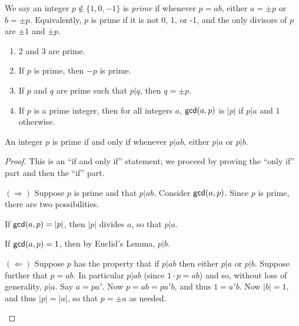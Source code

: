\begin{dfn}[Prime] \label{dfn:zz-prime}
We say an integer \(p \notin \{1,0,-1\}\) is \emph{prime} if whenever \(p = ab\), either \(a = \pm p\) or \(b = \pm p\).
Equivalently, \(p\) is prime if it is not 0, 1, or -1, and the only divisors of \(p\) are \(\pm 1\) and \(\pm p\).
\end{dfn}

\begin{prop} \mbox{}
\begin{enumerate}
\item 2 and 3 are prime.
\item If \(p\) is prime, then \(-p\) is prime.
\item If \(p\) and \(q\) are prime such that \(p|q\), then \(q = \pm p\).
\item If \(p\) is a prime integer, then for all integers \(a\), \(\mathsf{gcd}(a, p)\) is \(|p|\) if \(p|a\) and \(1\) otherwise.
\end{enumerate}
\end{prop}

\begin{prop} \label{prop:zz-prime-2}
An integer \(p\) is prime if and only if whenever \(p|ab\), either \(p|a\) or \(p|b\).
\end{prop}

\begin{proof}
This is an ``if and only if'' statement; we proceed by proving the ``only if'' part and then the ``if'' part.
\begin{inlineproplist}
\item[\((\Rightarrow)\)] Suppose \(p\) is prime and that \(p|ab\).
Consider \(\mathsf{gcd}(a, p)\).
Since \(p\) is prime, there are two possibilities.
\begin{inlineproplist}
\item If \(\mathsf{gcd}(a, p) = |p|\), then \(|p|\) divides \(a\), so that \(p|a\).
\item If \(\mathsf{gcd}(a, p) = 1\), then by Euclid's Lemma, \(p|b\).
\end{inlineproplist}

\item[\((\Leftarrow)\)] Suppose \(p\) has the property that if \(p|ab\) then either \(p|a\) or \(p|b\).
Suppose further that \(p = ab\).
In particular \(p|ab\) (since \(1 \cdot p = ab\)) and so, without loss of generality, \(p|a\).
Say \(a = pa'\).
Now \(p = ab = pa'b\), and thus \(1 = a'b\).
Now \(|b| = 1\), and thus \(|p| = |a|\), so that \(p = \pm a\) as needed.
\end{inlineproplist}
\end{proof}

